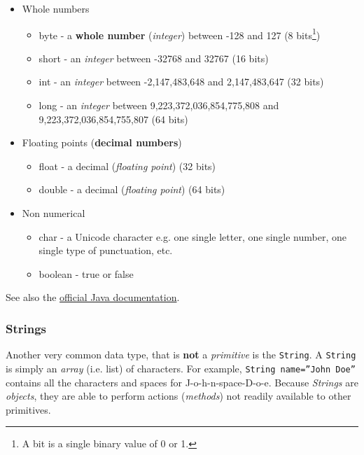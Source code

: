 \documentclass{article}
\begin{document}
\begin{flushleft}
\begin{tcolorbox}[enhanced,width=5in,center upper,
    fontupper=\bfseries,drop fuzzy shadow southwest,
    boxrule=0.4pt,sharp corners,colframe=yellow!80!black,colback=yellow!10]
\begin{itemize}
\item Whole numbers
  \begin{itemize}
  \item byte - a \textbf{whole number} (\emph{integer}) between -128 and 127 (8 bits\footnote{A bit is a single binary value of 0 or 1.})
  \item short - an \emph{integer} between -32768 and 32767 (16 bits)
  \item int  - an \emph{integer} between -2,147,483,648 and 2,147,483,647 (32 bits)
  \item long -  an \emph{integer} between 9,223,372,036,854,775,808 and
    9,223,372,036,854,755,807 (64 bits)
  \end{itemize}
  \item Floating points (\textbf{decimal numbers})
    \begin{itemize}
    \item float - a decimal (\emph{floating point}) (32 bits)
    \item double - a decimal (\emph{floating point}) (64 bits)
    \end{itemize}
    \item Non numerical
      \begin{itemize}
      \item char - a Unicode character e.g. one single letter, one single number, one single type of punctuation, etc. 
        \item boolean - true or false 
      \end{itemize}
\end{itemize}
\end{tcolorbox}


{\footnotesize See also the \href{https://docs.oracle.com/javase/tutorial/java/nutsandbolts/datatypes.html}{official Java documentation}.} 
\subsubsection{Strings}
Another very common data type, that is \textbf{not} a \emph{primitive} is the  \texttt{String}. A  \texttt{String} is simply an \emph{array} (i.e. list) of characters. For example,  \texttt{String name=''John Doe''} contains all the characters and spaces for J-o-h-n-space-D-o-e. Because \emph{Strings} are \emph{objects}, they are able to perform actions (\emph{methods}) not readily available to other primitives.  


\end{flushleft}
\end{document}

